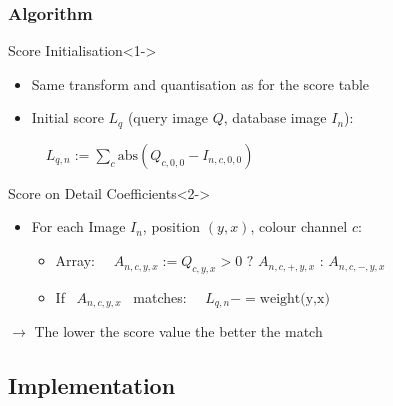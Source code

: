 \documentclass{beamer}
\newcommand\rarrow{$\longrightarrow$ } %
\begin{document}
\begin{frame}
  \frametitle{Algorithm}

  \begin{block}{Score Initialisation}<1->
    \begin{itemize}
    \item Same transform and quantisation as for the score table
    \item Initial score $L_q$ (query image $Q$, database image $I_n$):

      \medskip
      ~~$L_{q,n} := \sum_{c} \mbox{abs}(Q_{c,0,0} - I_{n,c,0,0})$
    \end{itemize}
  \end{block}

  \begin{block}{Score on Detail Coefficients}<2->
    \begin{itemize}
    \item For each Image $I_n$, position $(y,x)$, colour
      channel $c$:\vspace{4pt}
      \begin{itemize}
      \item Array:~~ $A_{n,c,y,x} := Q_{c,y,x} > 0 \mbox{~?~} A_{n,c,+,y,x}
        \mbox{~:~} A_{n,c,-,y,x}$\vspace{4pt}
      \item If ~$A_{n,c,y,x}$ ~matches: ~~$L_{q,n} -= \mbox{weight(y,x)}$\vspace{4pt}
      \end{itemize}
    \end{itemize}
  \end{block}

  \pause
  \rarrow The lower the score value the better the match
\end{frame}

\subsection{Implementation}
\end{document}
